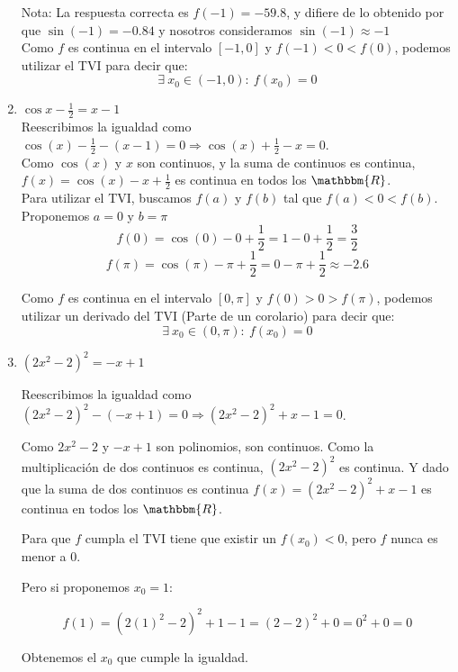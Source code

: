 \documentclass[12pt]{article}
\begin{document}
\begin{enumerate}[\hspace{9px} a)]
        Nota: La respuesta correcta es $f(-1)=-59.8$, y difiere de lo obtenido por que $\sin(-1)=-0.84$ y nosotros consideramos $\sin(-1) \approx -1$\\

        Como $f$ es continua en el intervalo $[-1,0]$ y \(f(-1)<0<f(0)\), podemos utilizar el TVI para decir que: \[\exists \ x_0 \in (-1,0) : \ f(x_0)=0\]

    \item \(\cos x - \displaystyle\frac{1}{2}=x-1\)\\

        Reescribimos la igualdad como \(\cos(x)-\displaystyle\frac{1}{2}-(x-1)=0 \Longrightarrow \cos(x)+\displaystyle\frac{1}{2}-x=0\).\\

        Como $\cos(x)$ y $x$ son continuos, y la suma de continuos es continua, $f(x)=\cos(x)-x+\displaystyle\frac{1}{2}$ es continua en todos los $\mathbbm{R}$.\\

        Para utilizar el TVI, buscamos $f(a)$ y $f(b)$ tal que $f(a)<0<f(b)$.\\

        Proponemos $a=0$ y $b=\pi$
        \[f(0)=\cos(0)-0+\frac{1}{2} = 1-0+\frac{1}{2} = \frac{3}{2}\]
        \[f(\pi)=\cos(\pi)-\pi+\frac{1}{2} = 0-\pi+\frac{1}{2} \approx -2.6\]

        Como $f$ es continua en el intervalo $[0,\pi]$ y \(f(0)>0>f(\pi)\), podemos utilizar un derivado del TVI (Parte de un corolario) para decir que: \[\exists \ x_0 \in (0,\pi) : \ f(x_0)=0\]


    \smallskip
    \item \((2x^2-2)^2=-x+1\)\medskip

    Reescribimos la igualdad como \((2x^2-2)^2-(-x+1)=0 \Longrightarrow (2x^2-2)^2+x-1=0\).\medskip

    Como $2x^2-2$ y $-x+1$ son polinomios, son continuos. Como la multiplicación de dos continuos es continua, $(2x^2-2)^2$ es continua. Y dado que la suma de dos continuos es continua $f(x)=(2x^2-2)^2+x-1$ es continua en todos los $\mathbbm{R}$.\medskip

    Para que $f$ cumpla el TVI tiene que existir un $f(x_0)<0$, pero $f$ nunca es menor a 0.

    Pero si proponemos $x_0=1$:

    \[f(1)=(2(1)^2-2)^2+1-1=(2-2)^2+0=0^2+0=0\]

    Obtenemos el $x_0$ que cumple la igualdad.\medskip

\end{enumerate}
\end{document}

